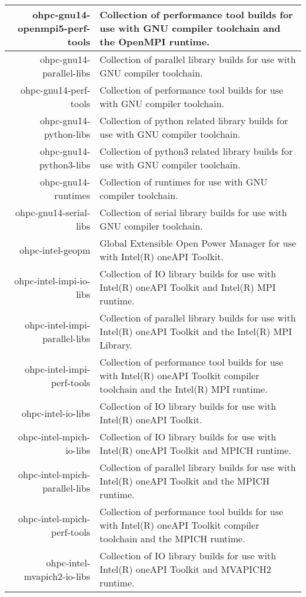 \begin{tabularx}{\textwidth}{r|X}
\hline
ohpc-gnu14-openmpi5-perf-tools & Collection of performance tool builds for use with GNU compiler toolchain and the OpenMPI runtime. \\
\hline
ohpc-gnu14-parallel-libs & Collection of parallel library builds for use with GNU compiler toolchain. \\
\hline
ohpc-gnu14-perf-tools & Collection of performance tool builds for use with GNU compiler toolchain. \\
\hline
ohpc-gnu14-python-libs & Collection of python related library builds for use with GNU compiler toolchain. \\
\hline
ohpc-gnu14-python3-libs & Collection of python3 related library builds for use with GNU compiler toolchain. \\
\hline
ohpc-gnu14-runtimes & Collection of runtimes for use with GNU compiler toolchain. \\
\hline
ohpc-gnu14-serial-libs & Collection of serial library builds for use with GNU compiler toolchain. \\
\hline
ohpc-intel-geopm & Global Extensible Open Power Manager for use with Intel(R) oneAPI Toolkit. \\
\hline
ohpc-intel-impi-io-libs & Collection of IO library builds for use with Intel(R) oneAPI Toolkit and Intel(R) MPI runtime. \\
\hline
ohpc-intel-impi-parallel-libs & Collection of parallel library builds for use with Intel(R) oneAPI Toolkit and the Intel(R) MPI Library. \\
\hline
ohpc-intel-impi-perf-tools & Collection of performance tool builds for use with Intel(R) oneAPI Toolkit compiler toolchain and the Intel(R) MPI runtime. \\
\hline
ohpc-intel-io-libs & Collection of IO library builds for use with Intel(R) oneAPI Toolkit. \\
\hline
ohpc-intel-mpich-io-libs & Collection of IO library builds for use with Intel(R) oneAPI Toolkit and MPICH runtime. \\
\hline
ohpc-intel-mpich-parallel-libs & Collection of parallel library builds for use with Intel(R) oneAPI Toolkit and the MPICH runtime. \\
\hline
ohpc-intel-mpich-perf-tools & Collection of performance tool builds for use with Intel(R) oneAPI Toolkit compiler toolchain and the MPICH runtime. \\
\hline
ohpc-intel-mvapich2-io-libs & Collection of IO library builds for use with Intel(R) oneAPI Toolkit and MVAPICH2 runtime. \\
\hline
\bottomrule
\end{tabularx}
